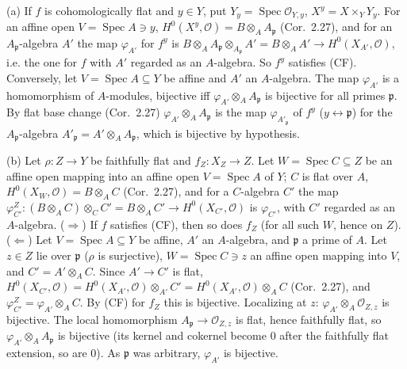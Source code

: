 \documentclass[11pt]{article}
\begin{document}
(a) If $f$ is cohomologically flat and $y\in Y$, put $Y_y=\operatorname{Spec}\mathcal O_{Y,y}$, $X^y=X\times_YY_y$. For an affine open $V=\operatorname{Spec}A\ni y$, $H^0(X^y,\mathcal O)=B\otimes_AA_{\mathfrak p}$ (Cor.~2.27), and for an $A_{\mathfrak p}$-algebra $A'$ the map $\varphi_{A'}$ for $f^y$ is $B\otimes_AA_{\mathfrak p}\otimes_{A_{\mathfrak p}}A'=B\otimes_AA'\to H^0(X_{A'},\mathcal O)$, i.e. the one for $f$ with $A'$ regarded as an $A$-algebra. So $f^y$ satisfies (CF). Conversely, let $V=\operatorname{Spec}A\subseteq Y$ be affine and $A'$ an $A$-algebra. The map $\varphi_{A'}$ is a homomorphism of $A$-modules, bijective iff $\varphi_{A'}\otimes_AA_{\mathfrak p}$ is bijective for all primes $\mathfrak p$. By flat base change (Cor.~2.27) $\varphi_{A'}\otimes_AA_{\mathfrak p}$ is the map $\varphi_{A'_{\mathfrak p}}$ of $f^y$ ($y\leftrightarrow\mathfrak p$) for the $A_{\mathfrak p}$-algebra $A'_{\mathfrak p}=A'\otimes_AA_{\mathfrak p}$, which is bijective by hypothesis.

(b) Let $\rho:Z\to Y$ be faithfully flat and $f_Z:X_Z\to Z$. Let $W=\operatorname{Spec}C\subseteq Z$ be an affine open mapping into an affine open $V=\operatorname{Spec}A$ of $Y$; $C$ is flat over $A$, $H^0(X_W,\mathcal O)=B\otimes_AC$ (Cor.~2.27), and for a $C$-algebra $C'$ the map $\varphi^Z_{C'}:(B\otimes_AC)\otimes_CC'=B\otimes_AC'\to H^0(X_{C'},\mathcal O)$ is $\varphi_{C'}$, with $C'$ regarded as an $A$-algebra.
($\Rightarrow$) If $f$ satisfies (CF), then so does $f_Z$ (for all such $W$, hence on $Z$).
($\Leftarrow$) Let $V=\operatorname{Spec}A\subseteq Y$ be affine, $A'$ an $A$-algebra, and $\mathfrak p$ a prime of $A$. Let $z\in Z$ lie over $\mathfrak p$ ($\rho$ is surjective), $W=\operatorname{Spec}C\ni z$ an affine open mapping into $V$, and $C'=A'\otimes_AC$. Since $A'\to C'$ is flat, $H^0(X_{C'},\mathcal O)=H^0(X_{A'},\mathcal O)\otimes_{A'}C'=H^0(X_{A'},\mathcal O)\otimes_AC$ (Cor.~2.27), and $\varphi^Z_{C'}=\varphi_{A'}\otimes_AC$. By (CF) for $f_Z$ this is bijective. Localizing at $z$: $\varphi_{A'}\otimes_A\mathcal O_{Z,z}$ is bijective. The local homomorphism $A_{\mathfrak p}\to\mathcal O_{Z,z}$ is flat, hence faithfully flat, so $\varphi_{A'}\otimes_AA_{\mathfrak p}$ is bijective (its kernel and cokernel become $0$ after the faithfully flat extension, so are $0$). As $\mathfrak p$ was arbitrary, $\varphi_{A'}$ is bijective.
\end{document}
